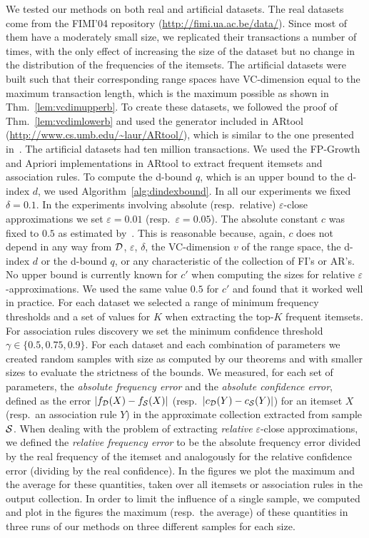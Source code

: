 We tested our methods on both real and artificial datasets. The real datasets
come from the FIMI'04 repository (\url{http://fimi.ua.ac.be/data/}). Since most
of them have a moderately small size, we replicated their transactions a number
of times, with the only effect of increasing the size of the dataset but no
change in the distribution of the frequencies of the itemsets. The artificial
datasets were built such that their corresponding range spaces
have VC-dimension equal to the maximum transaction length, which is the
maximum possible as shown in Thm.~\ref{lem:vcdimupperb}. To create these
datasets, we followed the proof of Thm.~\ref{lem:vcdimlowerb} and used the
generator included in ARtool (\url{http://www.cs.umb.edu/~laur/ARtool/}), which
is similar to the one presented in~\citep{AgrawalS94}. The artificial datasets
had ten million transactions. We used the FP-Growth and
Apriori implementations in ARtool to extract frequent itemsets and association
rules. To compute the d-bound $q$, which is an upper bound to the d-index $d$,
we used Algorithm~\ref{alg:dindexbound}.
In all our experiments we fixed $\delta=0.1$. In the experiments involving
absolute (resp.~relative) $\varepsilon$-close approximations we set
$\varepsilon=0.01$ (resp.~$\varepsilon=0.05$). The absolute constant $c$ was fixed to
$0.5$ as %
estimated by~\citep{LofflerP09}. This is reasonable because, again, $c$
does not depend in any way from ${\cal D}$, $\varepsilon$, $\delta$, the VC-dimension
$v$ of the range space, the d-index $d$ or the d-bound $q$, or any
characteristic of the collection of FI's or AR's. No upper bound is currently
known for $c'$ when computing the sizes for relative
$\varepsilon$-approximations. We used the same value $0.5$ for $c'$ and
found that it worked well in practice. For each dataset we selected a
range of minimum frequency thresholds and a set of values for $K$ when
extracting the top-$K$ frequent itemsets. For association rules discovery we set
the minimum confidence threshold $\gamma\in\{0.5, 0.75, 0.9\}$. For each
dataset and each combination of parameters we created random samples with size
as computed by our theorems and with smaller sizes to evaluate the strictness
of the bounds.  
We measured, for each set of parameters, the \emph{absolute
frequency error} and the \emph{absolute confidence error}, defined 
as  the error
$|f_{\cal D}(X)-f_{\cal S}(X)|$ (resp.~$|c_{\cal D}(Y)-c_{\cal S}(Y)|$) for an itemset $X$
(resp.~an association rule $Y$) in the approximate collection extracted from sample ${\cal S}$.
When dealing with the
problem of extracting \emph{relative} $\varepsilon$-close approximations, we
defined the \emph{relative frequency error} to be the absolute
frequency error divided by the real frequency of the itemset and analogously for
the relative confidence error (dividing by the real confidence). In the figures
we plot the maximum and the average for these quantities, taken over all
itemsets or association rules in the output collection. In order to limit the
influence of a single sample, we computed and plot in the figures the maximum
(resp.~the average) of these quantities in three runs of our methods on three
different samples for each size.

